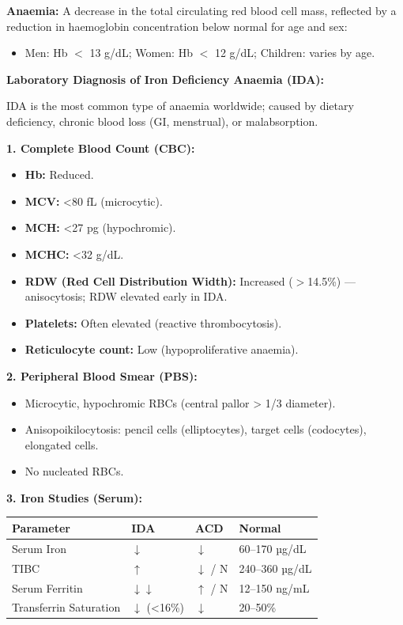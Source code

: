 \documentclass[11pt,a4paper]{article}
\begin{document}
\begin{ansbox}
\textbf{Anaemia:} A decrease in the total circulating red blood cell mass, reflected by a reduction in haemoglobin concentration below normal for age and sex:
\begin{itemize}[leftmargin=*]
    \item Men: Hb $<$ 13 g/dL; Women: Hb $<$ 12 g/dL; Children: varies by age.
\end{itemize}

\textbf{Laboratory Diagnosis of Iron Deficiency Anaemia (IDA):}

IDA is the most common type of anaemia worldwide; caused by dietary deficiency, chronic blood loss (GI, menstrual), or malabsorption.

\textbf{1. Complete Blood Count (CBC):}
\begin{itemize}[leftmargin=*]
    \item \textbf{Hb:} Reduced.
    \item \textbf{MCV:} \textless{}80 fL (microcytic).
    \item \textbf{MCH:} \textless{}27 pg (hypochromic).
    \item \textbf{MCHC:} \textless{}32 g/dL.
    \item \textbf{RDW (Red Cell Distribution Width):} Increased ($>$14.5\%) --- anisocytosis; RDW elevated early in IDA.
    \item \textbf{Platelets:} Often elevated (reactive thrombocytosis).
    \item \textbf{Reticulocyte count:} Low (hypoproliferative anaemia).
\end{itemize}

\textbf{2. Peripheral Blood Smear (PBS):}
\begin{itemize}[leftmargin=*]
    \item Microcytic, hypochromic RBCs (central pallor \textgreater{} 1/3 diameter).
    \item Anisopoikilocytosis: pencil cells (elliptocytes), target cells (codocytes), elongated cells.
    \item No nucleated RBCs.
\end{itemize}

\textbf{3. Iron Studies (Serum):}
\begin{center}
\begin{tabular}{llll}
\toprule
\textbf{Parameter} & \textbf{IDA} & \textbf{ACD} & \textbf{Normal} \\
\midrule
Serum Iron & $\downarrow$ & $\downarrow$ & 60--170 µg/dL \\
TIBC & $\uparrow$ & $\downarrow$ / N & 240--360 µg/dL \\
Serum Ferritin & $\downarrow\downarrow$ & $\uparrow$ / N & 12--150 ng/mL \\
Transferrin Saturation & $\downarrow$ (\textless{}16\%) & $\downarrow$ & 20--50\% \\
\bottomrule
\end{tabular}
\end{center}


\end{ansbox}
\end{document}
